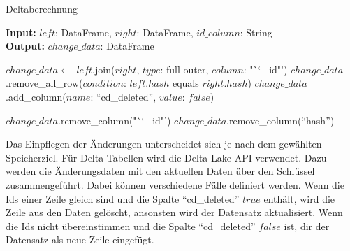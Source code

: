 \begin{algorithm}
    \caption{Deltaberechnung}
    \label{algo:delta-calc}
    \textbf{Input:} $left$: DataFrame, $right$: DataFrame, $id\_column$: String  \\
    \textbf{Output:} $change\_data$: DataFrame \\
    

    $change\_data \gets$ $left$.join($right$, $type$: full-outer, $column$: "`\char`~ id"')\;
    $change\_data$.remove\_all\_row($condition$: $left.hash$ equals $right.hash$)\;
    $change\_data$.add\_column($name$: "`cd\_deleted"', $value$: $false$)\;

    
    $change\_data$.remove\_column("`\char`~ id"')\;
    $change\_data$.remove\_column("`hash"')\;

\end{algorithm}

Das Einpflegen der Änderungen unterscheidet sich je nach dem gewählten Speicherziel.
Für Delta-Tabellen wird die Delta Lake API verwendet.
Dazu werden die Änderungsdaten mit den aktuellen Daten über den Schlüssel zusammengeführt.
Dabei können verschiedene Fälle definiert werden.
Wenn die Ids einer Zeile gleich sind und die Spalte "`cd\_deleted"' $true$ enthält, wird die Zeile aus den Daten gelöscht, ansonsten wird der Datensatz aktualisiert.
Wenn die Ids nicht übereinstimmen und die Spalte "`cd\_deleted"' $false$ ist, dir der Datensatz als neue Zeile eingefügt.

